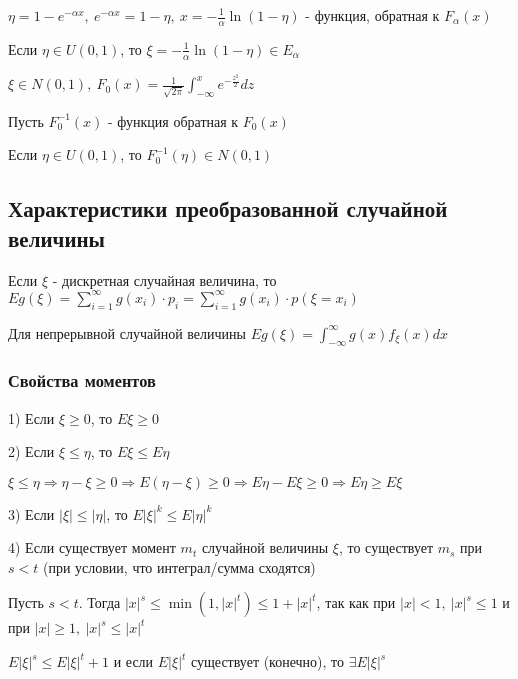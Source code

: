 \documentclass[12pt]{article}
\begin{document}
    $\eta = 1 - e^{-\alpha x}, \ e^{-\alpha x} = 1 - \eta, \ x = -\frac{1}{\alpha} \ln(1 - \eta)$ - функция, обратная к $F_\alpha(x)$

    Если $\eta \in U(0, 1)$, то $\xi = -\frac{1}{\alpha} \ln(1 - \eta) \in E_\alpha$

     $\xi \in N(0, 1), \ F_0(x) = \frac{1}{\sqrt{2\pi}} \int_{-\infty}^x e^{-\frac{z^2}{2}} dz$

    Пусть $F_0^{-1}(x)$ - функция обратная к $F_0(x)$

    Если $\eta \in U(0, 1)$, то $F_0^{-1}(\eta) \in N(0, 1)$

    \subsection{Характеристики преобразованной случайной величины}

    \hypertarget{expectedvalueoftransformedvariable}{}

    \begin{MyTheorem}
        \Ths Если $\xi$ - дискретная случайная величина, то $Eg(\xi) = \sum_{i = 1}^\infty g(x_i) \cdot p_i = \sum_{i = 1}^\infty g(x_i) \cdot p(\xi = x_i)$

        Для непрерывной случайной величины $Eg(\xi) = \int_{-\infty}^{\infty} g(x) f_\xi(x) dx$
    \end{MyTheorem}

    \hypertarget{momentsproperties}{}

    \subsubsection{Свойства моментов}

    1) Если $\xi \geq 0$, то $E\xi \geq 0$

    2) Если $\xi \leq \eta$, то $E\xi \leq E\eta$

    \begin{MyProof}
        $\xi \leq \eta \Longrightarrow \eta - \xi \geq 0 \Longrightarrow E(\eta - \xi) \geq 0 \Longrightarrow E\eta - E\xi \geq 0 \Longrightarrow E\eta \geq E\xi$
    \end{MyProof}

    3) Если $|\xi| \leq |\eta|$, то $E|\xi|^k \leq E|\eta|^k$

    4) Если существует момент $m_t$ случайной величины $\xi$, то существует $m_s$ при $s < t$ (при условии, что интеграл/сумма сходятся)

    \begin{MyProof}
        Пусть $s < t$. Тогда $|x|^s \leq \min(1, |x|^t) \leq 1 + |x|^t$, так как при $|x| < 1, \ |x|^s \leq 1$ и при $|x| \geq 1, \ |x|^s \leq |x|^t$
    
        $E|\xi|^s \leq E|\xi|^t + 1$ и если $E|\xi|^t$ существует (конечно), то $\exists E|\xi|^s$
    
    \end{MyProof}
\end{document}
